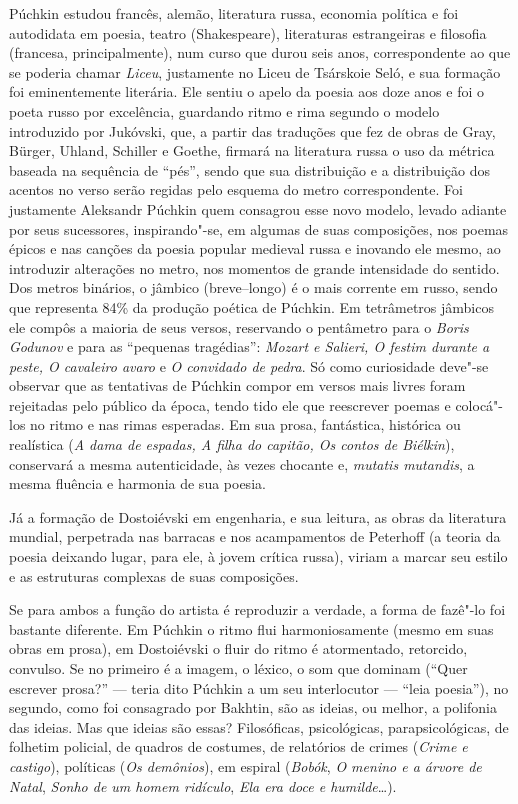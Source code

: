 Púchkin estudou francês, alemão, literatura russa, economia política e
foi autodidata em poesia, teatro (Shakespeare), literaturas
estrangeiras e filosofia (francesa, principalmente), num curso que
durou seis anos, correspondente ao que se poderia chamar \emph{Liceu},
justamente no Liceu de Tsárskoie Seló, e sua formação foi eminentemente
literária. Ele sentiu o apelo da poesia aos doze anos e foi o poeta
russo por excelência, guardando ritmo e rima segundo o modelo
introduzido por Jukóvski, que, a partir das traduções que fez de obras
de Gray, Bürger, Uhland, Schiller e Goethe, firmará na literatura russa
o uso da métrica baseada na sequência de ``pés'', sendo que sua
distribuição e a distribuição dos acentos no verso serão regidas pelo
esquema do metro correspondente. Foi justamente Aleksandr Púchkin quem
consagrou esse novo modelo, levado adiante por seus sucessores, inspirando"-se, em algumas de suas
composições, nos poemas épicos e nas canções da poesia popular medieval
russa e inovando ele mesmo, ao introduzir alterações no metro, nos
momentos de grande intensidade do sentido. Dos metros binários, o
jâmbico (breve--longo) é o mais corrente em russo, sendo que representa 84\% da
produção poética de Púchkin. Em tetrâmetros jâmbicos ele compôs a
maioria de seus versos, reservando o pentâmetro para o \emph{Boris
Godunov} e para as ``pequenas tragédias'': \emph{Mozart e Salieri,
O festim durante a peste, O cavaleiro avaro} e \emph{O convidado de
pedra}. Só como curiosidade deve"-se observar que as tentativas de
Púchkin compor em versos mais livres foram rejeitadas pelo público da
época, tendo tido ele que reescrever poemas e colocá"-los no ritmo e nas rimas
esperadas. Em sua prosa, fantástica, histórica ou realística (\emph{A
dama de espadas, A filha do capitão, Os contos de Biélkin}), conservará a
mesma autenticidade, às vezes chocante e, \emph{mutatis mutandis}, a
mesma fluência e harmonia de sua poesia.

Já a formação de Dostoiévski em engenharia, e sua leitura, as obras
da literatura mundial, perpetrada nas barracas e nos acampamentos de
Peterhoff (a teoria da poesia deixando lugar, para ele, à jovem crítica
russa), viriam a marcar seu estilo e as estruturas complexas de suas composições.

Se para ambos a função do artista é reproduzir a verdade, a forma de
fazê"-lo foi bastante diferente. Em Púchkin o ritmo flui harmoniosamente
(mesmo em suas obras em prosa), em Dostoiévski o fluir do ritmo é
atormentado, retorcido, convulso. Se no primeiro é a imagem, o léxico, o
som que dominam (``Quer escrever prosa?'' --- teria dito Púchkin a um seu
interlocutor --- ``leia poesia''), no segundo, como foi consagrado por
Bakhtin, são as ideias, ou melhor, a polifonia das ideias. Mas que ideias
são essas? Filosóficas, psicológicas, parapsicológicas, de folhetim
policial, de quadros de costumes, de relatórios de crimes (\emph{Crime e
castigo}), políticas (\emph{Os demônios}), em espiral (\emph{Bobók}, \emph{O menino e a árvore de Natal}, \emph{Sonho de um homem ridículo},
\emph{Ela era doce e humilde}\ldots{}).

